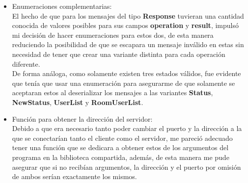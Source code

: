 \documentclass[11pt]{article}
\begin{document}
\begin{itemize}
    \item Enumeraciones complementarias:\\
    El hecho de que para los mensajes del tipo \textbf{Response} tuvieran una cantidad conocida de valores posibles para sus campos \textbf{operation} y \textbf{result}, impulsó mi decisión de hacer enumeraciones para estos dos, de esta manera reduciendo la posibilidad de que se escapara un mensaje inválido en estas sin necesidad de tener que crear una variante distinta para cada operación diferente.\\
    De forma análoga, como solamente existen tres estados válidos, fue evidente que tenía que usar una enumeración para asegurarme de que solamente se aceptaran estos al deserializar los mensajes a las variantes \textbf{Status}, \textbf{NewStatus}, \textbf{UserList} y \textbf{RoomUserList}.
    \item Función para obtener la dirección del servidor:\\
    Debido a que era necesario tanto poder cambiar el puerto y la dirección a la que se conectarían tanto el cliente como el servidor, me pareció adecuado tener una función que se dedicara a obtener estos de los argumentos del programa en la biblioteca compartida, además, de esta manera me pude asegurar que si no recibían argumentos, la dirección y el puerto por omisión de ambos serían exactamente los mismos.
\end{itemize}
\end{document}
